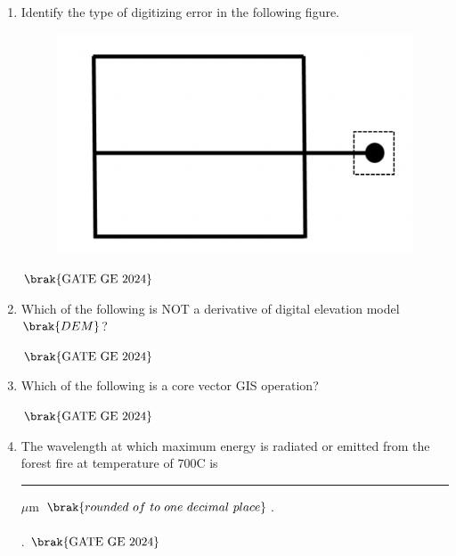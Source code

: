 \documentclass[journal,12pt,onecolumn]{IEEEtran}
\theoremstyle{remark}
\begin{document}
\begin{enumerate}
\begin{enumerate}
\begin{multicols}{4}
\end{multicols}
\end{enumerate}
\hfill $\brak{\text{GATE GE 2024}}$
\bigskip
\item Identify the type of digitizing error in the following figure.
\\
\begin{figure}[H]
    \centering
    \includegraphics[width=0.25\columnwidth]{figs/fig4.png}
    \caption{}
    \label{figs:fig4}
\end{figure}

\begin{enumerate}
\end{enumerate}
\hfill $\brak{\text{GATE GE 2024}}$
\bigskip
\item Which of the following is NOT a derivative of digital elevation model $\brak{DEM}$?
\begin{enumerate}
\end{enumerate}
\hfill $\brak{\text{GATE GE 2024}}$
\bigskip
\item Which of the following is a core vector GIS operation?
\begin{enumerate}
\end{enumerate}
\hfill $\brak{\text{GATE GE 2024}}$
\bigskip
\item The wavelength at which maximum energy is radiated or emitted from the forest fire at temperature of $700$\degree C is \rule{2cm}{0.5mm} $\mu$m $\brak{rounded\ of\ to\ one\ decimal\ place}$.
\\
\\.
\hfill $\brak{\text{GATE GE 2024}}$
\bigskip


\end{enumerate}
\end{document}
